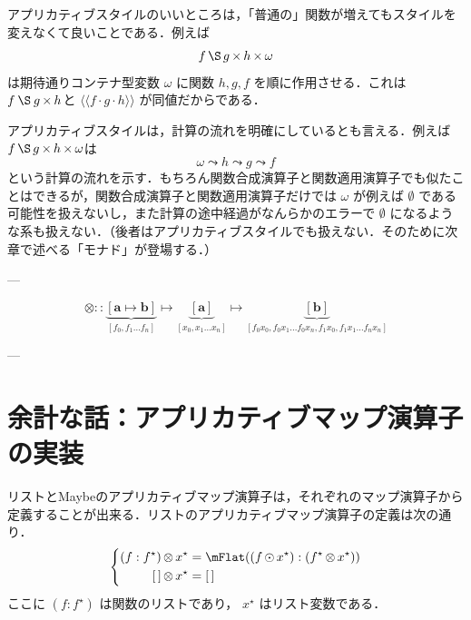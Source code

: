 \documentclass[a4paper]{jsbook}
\newcommand{\mType}[1]{\mathbf{#1}}
\newcommand{\mListType}[1]{[\mType{#1}]}
\newcommand{\mEmptyList}{{[\,]}}
\newcommand{\mNothing}{\emptyset}
\newcommand{\mPureWith}[1]{\langle\!\langle#1\rangle\!\rangle}
\newcommand{\mList}[1]{{#1}^\mathrm{\star}}
\DeclareMathOperator{\mMapsTo}{\mapsto}
\DeclareMathOperator{\mComp}{\cdot}
\DeclareMathOperator{\mFlow}{\leadsto}
\DeclareMathOperator{\mMapList}{\odot}
\DeclareMathOperator{\mApplicativeApply}{\S}
\DeclareMathOperator{\mApplicativeMap}{\times}
\DeclareMathOperator{\mApplicativeMapList}{\otimes}
\newcommand{\mathTypeParameter}[1]{\mathbf{#1}}
\newcommand{\mathListWith}[1]{\left[#1\right]}
\newcommand{\mathApplicativeApply}{\mathbin{\S}}
\newcommand{\mathApplicativeMap}{\mathbin{\otimes}}
\newcommand{\mathIn}{\mathrel{::}}
\begin{document}
アプリカティブスタイルのいいところは，「普通の」関数が増えてもスタイルを変えなくて良いことである．例えば
\begin{equation}
f\mApplicativeApply g\mApplicativeMap h\mApplicativeMap\omega
\end{equation}
は期待通りコンテナ型変数 $\omega$ に関数 $h,g,f$ を順に作用させる．これは $f\mathApplicativeApply g\mApplicativeMap h$と $\mPureWith{f\mComp g\mComp h}$ が同値だからである．

アプリカティブスタイルは，計算の流れを明確にしているとも言える．例えば $f\mApplicativeApply g\mApplicativeMap h\mApplicativeMap\omega$は
\begin{equation}
\omega\mFlow h\mFlow g\mFlow f
\end{equation}
という計算の流れを示す．もちろん関数合成演算子と関数適用演算子でも似たことはできるが，関数合成演算子と関数適用演算子だけでは $\omega$ が例えば $\mNothing$ である可能性を扱えないし，また計算の途中経過がなんらかのエラーで $\mNothing$ になるような系も扱えない．（後者はアプリカティブスタイルでも扱えない．そのために次章で述べる「モナド」が登場する．）

---


\begin{equation*}
\mathApplicativeMap\mathIn
\underbrace{\mathListWith{\mathTypeParameter{a}\mMapsTo\mathTypeParameter{b}}}_{\mathListWith{f_0,f_1\dots f_n}}
\mMapsTo
\underbrace{\mListType{a}}_{\mathListWith{x_0,x_1\dots x_n}}
\mMapsTo
\underbrace{\mListType{\mathTypeParameter{b}}}_{\mathListWith{f_0x_0,f_0x_1\dots f_0x_n,f_1x_0,f_1x_1\dots f_nx_n}}
\end{equation*}

---



\section{余計な話：アプリカティブマップ演算子の実装}

リストとMaybeのアプリカティブマップ演算子は，それぞれのマップ演算子から定義することが出来る．リストのアプリカティブマップ演算子の定義は次の通り．
\begin{equation}
\left\{
\begin{split}
(f:\mList{f})\mApplicativeMapList\mList{x}&=\mFlat((f\mMapList\mList{x}):(\mList{f}\mApplicativeMapList\mList{x}))\\
\mEmptyList\mApplicativeMapList\mList{x}&=\mEmptyList
\end{split}
\right.
\end{equation}
ここに $(f:\mList{f})$ は関数のリストであり， $\mList{x}$ はリスト変数である．
\end{document}
